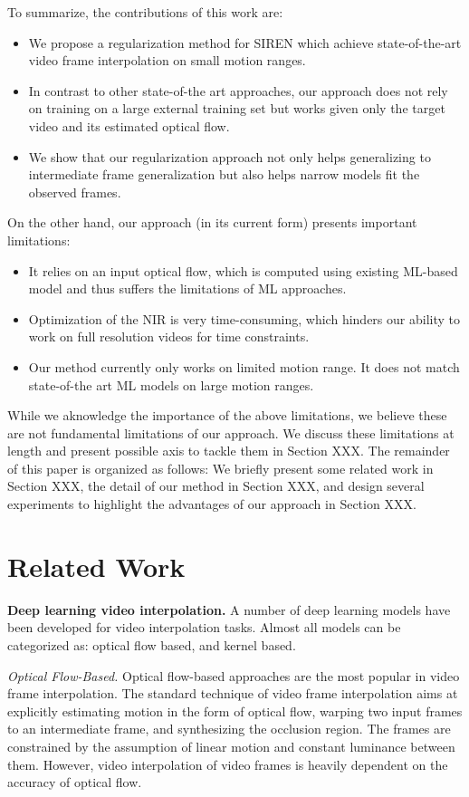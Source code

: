 \documentclass{article}
\begin{document}
To summarize, the contributions of this work are:
\begin{itemize}
\item We propose a regularization method for SIREN which achieve state-of-the-art video frame interpolation on small motion ranges.
\item In contrast to other state-of-the art approaches, our approach does not rely on training on a large external training set but works given only the target video and its estimated optical flow.
\item We show that our regularization approach not only helps generalizing to intermediate frame generalization but also helps narrow models fit the observed frames.
\end{itemize}

On the other hand, our approach (in its current form) presents important limitations:

\begin{itemize}
\item It relies on an input optical flow, which is computed using existing ML-based model and thus suffers the limitations of ML approaches.
\item Optimization of the NIR is very time-consuming, which hinders our ability to work on full resolution videos for time constraints.
\item Our method currently only works on limited motion range. It does not match state-of-the art ML models on large motion ranges.
\end{itemize}

While we aknowledge the importance of the above limitations, 
we believe these are not fundamental limitations of our approach.
We discuss these limitations at length and present possible axis to tackle them in Section XXX.
The remainder of this paper is organized as follows:
We briefly present some related work in Section XXX, the detail of our method in Section XXX,
and design several experiments to highlight the advantages of our approach in Section XXX.

\section{Related Work}

\textbf{Deep learning video interpolation.}
A number of deep learning models have been developed for video interpolation tasks.
Almost all models can be categorized as: optical flow based, and kernel based.

\textit{Optical Flow-Based.}
Optical flow-based approaches are the most popular in video frame interpolation.
The standard technique of video frame interpolation aims at explicitly estimating motion in the form of optical flow, warping two input frames to an intermediate frame, and synthesizing the occlusion region. The frames are constrained by the assumption of linear motion and constant luminance between them.
However, video interpolation of video frames is heavily dependent on the accuracy of optical flow.
\end{document}
